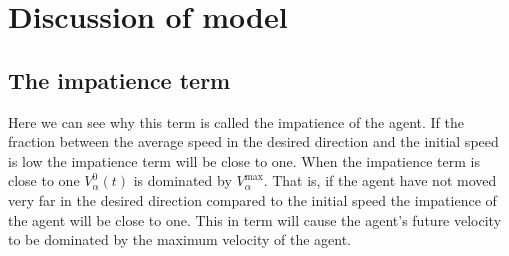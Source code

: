 \section{Discussion of model}
\subsection{The impatience term}
 Here we can see why this term is 
called the impatience of the agent. If the fraction between the average speed 
in the desired direction and the initial speed is low the impatience term will 
be close to one. When the impatience term is close to one $V_{\alpha}^{0} 
\left( t \right)$ is dominated by $V_{\alpha}^{\text{max}}$. That is, if the 
agent have not moved very far in the desired direction compared to the initial 
speed the impatience of the agent will be close to one. This in term will 
cause the agent's future velocity to be dominated by the maximum velocity of 
the agent.